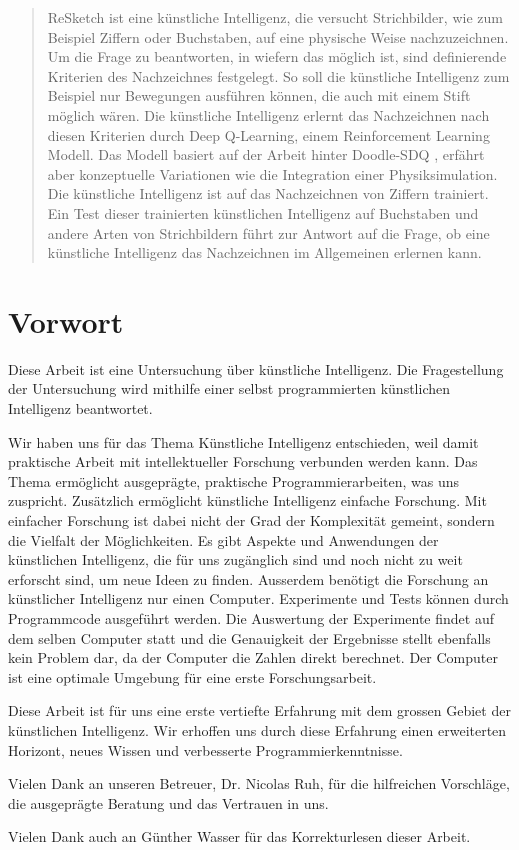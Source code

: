 \begin{abstract}\label{abstract} ReSketch ist eine künstliche Intelligenz, die
versucht Strichbilder, wie zum Beispiel Ziffern oder Buchstaben, auf eine
physische Weise nachzuzeichnen. Um die Frage zu beantworten, in wiefern das
möglich ist, sind definierende Kriterien des Nachzeichnes festgelegt. So soll
die künstliche Intelligenz zum Beispiel nur Bewegungen ausführen können, die auch
mit einem Stift möglich wären. Die künstliche Intelligenz erlernt das
Nachzeichnen nach diesen Kriterien durch Deep Q-Learning, einem Reinforcement
Learning Modell. Das Modell basiert auf der Arbeit hinter Doodle-SDQ
\cite{zhou_learning_2018}, erfährt aber konzeptuelle Variationen wie die
Integration einer Physiksimulation. Die künstliche Intelligenz ist auf
das Nachzeichnen von Ziffern trainiert. Ein Test dieser trainierten künstlichen
Intelligenz auf Buchstaben und andere Arten von Strichbildern führt zur Antwort
auf die Frage, ob eine künstliche Intelligenz das Nachzeichnen im Allgemeinen
erlernen kann.
\end{abstract}

\newpage

\section*{Vorwort}\label{vorwort}
Diese Arbeit ist eine Untersuchung über künstliche Intelligenz. Die
Fragestellung der Untersuchung wird mithilfe einer selbst programmierten künstlichen
Intelligenz beantwortet. 

Wir haben uns für das Thema Künstliche Intelligenz entschieden, weil damit
praktische Arbeit mit intellektueller Forschung verbunden werden kann. Das Thema
ermöglicht ausgeprägte, praktische Programmierarbeiten, was uns zuspricht.
Zusätzlich ermöglicht künstliche Intelligenz einfache Forschung. Mit einfacher
Forschung ist dabei nicht der Grad der Komplexität gemeint, sondern die Vielfalt
der Möglichkeiten. Es gibt Aspekte und Anwendungen der künstlichen Intelligenz,
die für uns zugänglich sind und noch nicht zu weit erforscht sind, um neue Ideen
zu finden. Ausserdem benötigt die Forschung an künstlicher Intelligenz nur einen
Computer. Experimente und Tests können durch Programmcode ausgeführt werden. Die
Auswertung der Experimente findet auf dem selben Computer statt und die
Genauigkeit der Ergebnisse stellt ebenfalls kein Problem dar, da der Computer
die Zahlen direkt berechnet. Der Computer ist eine optimale Umgebung für eine
erste Forschungsarbeit.

Diese Arbeit ist für uns eine erste vertiefte Erfahrung mit dem grossen Gebiet
der künstlichen Intelligenz. Wir erhoffen uns durch diese Erfahrung einen
erweiterten Horizont, neues Wissen und verbesserte Programmierkenntnisse.

Vielen Dank an unseren Betreuer, Dr. Nicolas Ruh, für die hilfreichen Vorschläge,
die ausgeprägte Beratung und das Vertrauen in uns.

Vielen Dank auch an Günther Wasser für das Korrekturlesen dieser Arbeit.
